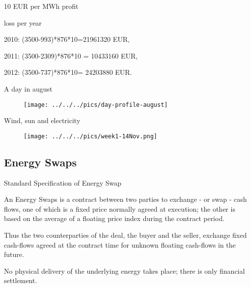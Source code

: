 	10 EUR per MWh profit






	loss per year






	2010: (3500-993)*876*10=21961320 EUR,


	2011:  (3500-2309)*876*10 = 10433160 EUR,


	2012: (3500-737)*876*10= 24203880 EUR.










{A day in august}
\begin{figure}[htp]
\centering
\texttt{[image: ../../../pics/day-profile-august]}
\end{figure}

{Wind, sun and electricity}
\begin{figure}[htp]
\centering
\texttt{[image: ../../../pics/week1-14Nov.png]}
\end{figure}

\subsection{Energy Swaps}

{Standard Specification of Energy Swap}






	An Energy Swaps is a contract between two parties to exchange - or swap - cash flows, one of which is a fixed price normally agreed at execution; the other is based on the average of a floating price index during the contract period.


	Thus the two counterparties of the deal, the buyer and the seller, exchange fixed cash-flows agreed at the contract time for unknown floating cash-flows in the future.


	
No physical delivery of the underlying energy takes place; there is only financial settlement.





